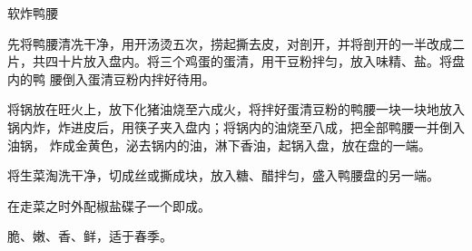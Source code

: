 \begin{recipe}{软炸鸭腰}

\ingredients


\preparation

\step 先将鸭腰清冼干净，用开汤烫五次，捞起撕去皮，对剖开，并将剖开的一半改成二
片，共四十片放入盘内。将三个鸡蛋的蛋清，用干豆粉拌匀，放入味精、盐。将盘内的鸭
腰倒入蛋清豆粉内拌好待用。

\step 将锅放在旺火上，放下化猪油烧至六成火，将拌好蛋清豆粉的鸭腰一块一块地放入
锅内炸，炸进皮后，用筷子夹入盘内；将锅内的油烧至八成，把全部鸭腰一并倒入油锅，
炸成金黄色，泌去锅内的油，淋下香油，起锅入盘，放在盘的一端。

\step 将生菜淘洗干净，切成丝或撕成块，放入糖、醋拌匀，盛入鸭腰盘的另一端。

\step 在走菜之时外配椒盐碟子一个即成。

\features

脆、嫩、香、鲜，适于春季。

\end{recipe}

